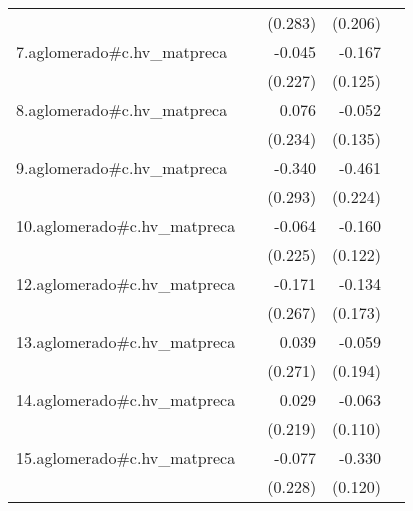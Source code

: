 {\begin{longtable}{l*{4}{D{.}{.}{-1}}}
            &                     &     (0.283)         &     (0.206)         &                     \\
\addlinespace
7.aglomerado#c.hv\_matpreca&                     &      -0.045         &      -0.167         &                     \\
            &                     &     (0.227)         &     (0.125)         &                     \\
\addlinespace
8.aglomerado#c.hv\_matpreca&                     &       0.076         &      -0.052         &                     \\
            &                     &     (0.234)         &     (0.135)         &                     \\
\addlinespace
9.aglomerado#c.hv\_matpreca&                     &      -0.340         &      -0.461\sym{*}  &                     \\
            &                     &     (0.293)         &     (0.224)         &                     \\
\addlinespace
10.aglomerado#c.hv\_matpreca&                     &      -0.064         &      -0.160         &                     \\
            &                     &     (0.225)         &     (0.122)         &                     \\
\addlinespace
12.aglomerado#c.hv\_matpreca&                     &      -0.171         &      -0.134         &                     \\
            &                     &     (0.267)         &     (0.173)         &                     \\
\addlinespace
13.aglomerado#c.hv\_matpreca&                     &       0.039         &      -0.059         &                     \\
            &                     &     (0.271)         &     (0.194)         &                     \\
\addlinespace
14.aglomerado#c.hv\_matpreca&                     &       0.029         &      -0.063         &                     \\
            &                     &     (0.219)         &     (0.110)         &                     \\
\addlinespace
15.aglomerado#c.hv\_matpreca&                     &      -0.077         &      -0.330\sym{**} &                     \\
            &                     &     (0.228)         &     (0.120)         &                     \\

\end{longtable}}
